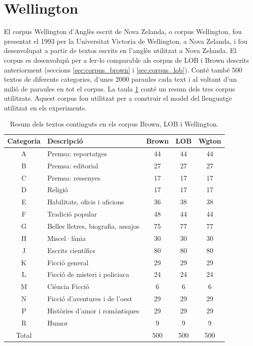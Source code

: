 \section{Wellington}\label{sec:corpus_wellington}
El corpus Wellington d'Anglès escrit de Nova Zelanda, o corpus Wellington, fou presentat el 1993\cite{bauer1993manual} per la Universitat Victoria de Wellington, a Nova Zelanda, i fou desenvolupat a partir de textos escrits en l'anglès utilitzat a Nova Zelanda. El corpus es desenvolupà per a fer-lo comparable als corpus de LOB i Brown descrits anteriorment (seccions \ref{sec:corpus_brown} i \ref{sec:corpus_lob}). Conté també 500 textos de diferents categories, d'unes 2000 paraules cada text i al voltant d'un milió de paraules en tot el corpus. La taula \ref{tab:corpus_lm} conté un resum dels tres corpus utilitzats. Aquest corpus fou utilitzat per a construir el model del llenguatge utilitzat en els experiments.

\begin{table}
\centering
\begin{tabular}{|c|l|c|c|c|}
\hline
Categoria & Descripció & Brown & LOB & Wgton\\
\hline
A & Premsa: reportatges & 44 & 44 & 44\\
B & Premsa: editorial & 27 & 27 & 27\\
C & Premsa: ressenyes & 17 & 17 & 17\\
D & Religió & 17 & 17 & 17\\
E & Habilitats, oficis i aficions & 36 & 38 & 38\\
F & Tradició popular & 48 & 44 & 44\\
G & Belles lletres, biografia, assajos & 75 & 77 & 77\\
H & Miscel·lània & 30 & 30 & 30\\
J & Escrits científics & 80 & 80 & 80\\
K & Ficció general & 29 & 29 & 29\\
L & Ficció de misteri i policiaca & 24 & 24 & 24\\
M & Ciència Ficció & 6 & 6 & 6\\
N & Ficció d'aventures i de l'oest & 29 & 29 & 29\\
P & Històries d'amor i romàntiques & 29 & 29 & 29\\
R & Humor & 9 & 9 & 9\\
\hline
Total & & 500 & 500 & 500\\
\hline
\end{tabular}
\caption{Resum dels textos continguts en els corpus Brown, LOB i Wellington.}\label{tab:corpus_lm}
\end{table}
